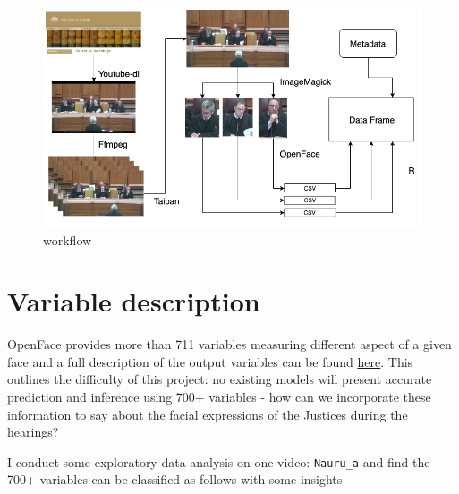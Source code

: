 \documentclass{monashthesis}
\begin{document}
\begin{figure}
\includegraphics[width=1\linewidth]{figures/workflow} \caption{workflow \label{fig:workflow}}\label{fig:unnamed-chunk-1}
\end{figure}

\hypertarget{variable-description}{%
\section{Variable description}\label{variable-description}}

OpenFace provides more than 711 variables measuring different aspect of a given face and a full description of the output variables can be found \href{https://github.com/TadasBaltrusaitis/OpenFace/wiki/Action-Units}{here}. This outlines the difficulty of this project: no existing models will present accurate prediction and inference using 700+ variables - how can we incorporate these information to say about the facial expressions of the Justices during the hearings?

I conduct some exploratory data analysis on one video: \texttt{Nauru\_a} and find the 700+ variables can be classified as follows with some insights
\end{document}
